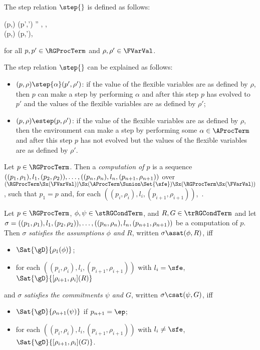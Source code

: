 \documentclass[runningheads]{llncs}
\begin{document}
The step relation $\step{}$ is defined as follows: 
\begin{ldispl}
(p,\rho) \step{\alpha} (p',\rho') \;\;\;\;
\; \rho'' \in \FVarVal,\; 
\;,
\\
(p,\rho) \estep (p,\rho')\;,
\end{ldispl}%
for all $p,p' \in \RGProcTerm$ and $\rho,\rho' \in \FVarVal$.

The step relation $\step{}$ can be explained as follows:
\begin{itemize}
\item
$(p,\rho) \step{\alpha} (p',\rho')$: 
if the value of the flexible variables are as defined by $\rho$, then 
$p$ can make a step by performing $\alpha$ and after this step $p$ has 
evolved to $p'$ and the values of the flexible variables are as defined 
by $\rho'$;
\item
$(p,\rho) \estep (p,\rho')$: 
if the value of the flexible variables are as defined by $\rho$, then 
the environment can make a step by performing some
$\alpha \in \AProcTerm$ and after this step $p$ has not evolved but the 
values of the flexible variables are as defined by $\rho'$.
\end{itemize}

Let $p \in \RGProcTerm$.
Then a \emph{computation of $p$} is a sequence
$((p_1,\rho_1), l_1, (p_2,\rho_2)),\linebreak[2] \ldots,
 ((p_n,\rho_n), l_n, (p_{n+1},\rho_{n+1}))$
over 
$(\RGProcTerm \Sx (\FVarVal)) \Sx (\AProcTerm \Sunion \Set{\sfe}) \Sx
 (\RGProcTerm \Sx (\FVarVal))$,
such that $p_1 = p$ and, 
for each $((p_i,\rho_i), l_i, (p_{i+1},\rho_{i+1}))$,\,
.

Let $p \in \RGProcTerm$, $\phi,\psi \in \stRGCondTerm$, 
and $R,G \in \trRGCondTerm$ and let
$\sigma = 
 ((p_1,\rho_1), l_1, (p_2,\rho_2)),\linebreak[2] \ldots,
 ((p_n,\rho_n), l_n, (p_{n+1},\rho_{n+1}))$
be a computation of $p$.
Then $\sigma$ \emph{satisfies the assumptions $\phi$ and $R$}, written
$\sigma \asat (\phi,R)$, iff
\begin{itemize}
\item
$\Sat{\gD}{\rho_1(\phi)}$;
\item
for each $((p_i,\rho_i), l_i, (p_{i+1},\rho_{i+1}))$ with $l_i = \sfe$,
$\Sat{\gD}{[\rho_{i+1},\rho_i](R)}$ 
\end{itemize}
and $\sigma$ \emph{satisfies the commitments $\psi$ and $G$}, written
$\sigma \csat (\psi,G)$, iff
\begin{itemize}
\item
$\Sat{\gD}{\rho_{n+1}(\psi)}$ if $p_{n+1} = \ep$;
\item
for each $((p_i,\rho_i), l_i, (p_{i+1},\rho_{i+1}))$ with 
$l_i \neq \sfe$, $\Sat{\gD}{[\rho_{i+1},\rho_i](G)}$. 
\end{itemize}
\end{document}
